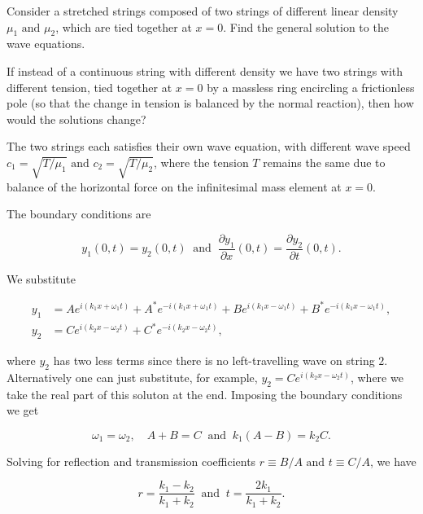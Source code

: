 \documentclass[a4paper,12pt]{report}
\begin{document}
{Consider a stretched strings composed of two strings  of different linear density \(\mu _1 \text { and } \mu _2  \), which are tied together at \(x=0\). Find the general solution to the wave equations.

If instead of a continuous string with different density we have two strings with different tension, tied together at \(x=0\) by a massless ring encircling a frictionless pole (so that the change in tension is balanced by the normal reaction), then how would the solutions change? }
{The two strings each satisfies their own wave equation, with different wave speed \(c_1 = \sqrt{T/\mu _1 } \text { and } c_2 = \sqrt{T/\mu _2 }\), where the tension \(T\) remains the same due to balance of the horizontal force on the infinitesimal mass element at \(x=0\).

The boundary conditions are 

\begin{equation}
	y_1(0,t) = y_2(0,t) ~\text { and }~ \frac{\partial y_1 }{\partial x}(0,t) = \frac{\partial y_2 }{\partial t}(0,t).    
\end{equation}

We substitute 

\begin{equation}
	\begin{aligned} 
	y_1  &= A e^{i (k_1 x+\omega_1  t)} + A^* e^{-i (k_1 x+\omega _1 t)} + B e^{i (k_1 x-\omega _1 t)} + B^* e^{-i (k_1 x-\omega _1 t)}, \\
	y_2 &= C e^{i (k_2 x-\omega _2 t)} + C^* e^{-i (k_2 x - \omega_2t )},  
	\end{aligned} 
\end{equation}

where \(y_2 \) has two less terms since there is no left-travelling wave on string \(2\). Alternatively one can just substitute, for example, \(y_{2} = Ce^{i(k_{2}x-\omega _{2}t  )}  \), where we take the real part of this soluton at the end. Imposing the boundary conditions we get 

\begin{equation}
	\omega _1 = \omega _2, \quad A+B=C ~\text { and }~ k_1(A-B) = k_2C.
\end{equation}

Solving for reflection and transmission coefficients \(r \equiv B /A \text { and } t \equiv C /A\), we have 

\begin{equation}
	r = \frac{k_1 - k_2 }{k_1 + k_2 } ~\text { and }~ t = \frac{2 k_1 }{k_1 + k_2 }.  
\end{equation}



}
\end{document}
